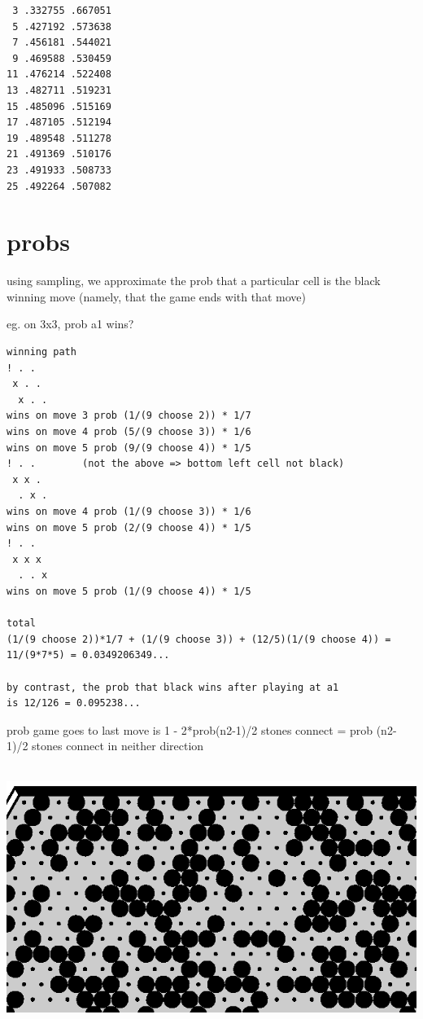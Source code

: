 \documentclass[12pt]{article}
\begin{document}

\begin{verbatim}
 3 .332755 .667051
 5 .427192 .573638
 7 .456181 .544021
 9 .469588 .530459
11 .476214 .522408
13 .482711 .519231
15 .485096 .515169
17 .487105 .512194
19 .489548 .511278
21 .491369 .510176
23 .491933 .508733
25 .492264 .507082
\end{verbatim}
\newpage
\vspace*{-3cm}

\newpage
\section{probs}
using sampling, we approximate the prob that a particular
cell is the black winning move (namely, that the game ends with that move)

eg. on 3x3, prob a1 wins?
\begin{verbatim}
winning path
! . .        
 x . .
  x . .
wins on move 3 prob (1/(9 choose 2)) * 1/7
wins on move 4 prob (5/(9 choose 3)) * 1/6
wins on move 5 prob (9/(9 choose 4)) * 1/5
! . .        (not the above => bottom left cell not black)
 x x .
  . x .
wins on move 4 prob (1/(9 choose 3)) * 1/6
wins on move 5 prob (2/(9 choose 4)) * 1/5
! . .        
 x x x
  . . x
wins on move 5 prob (1/(9 choose 4)) * 1/5

total
(1/(9 choose 2))*1/7 + (1/(9 choose 3)) + (12/5)(1/(9 choose 4)) = 
11/(9*7*5) = 0.0349206349...

by contrast, the prob that black wins after playing at a1
is 12/126 = 0.095238...
\end{verbatim}

prob game goes to last move is 1 - 2*prob(n2-1)/2 stones connect
= prob (n2-1)/2 stones connect in neither direction

\newpage
\ \hfill \includegraphics[scale=1]{draw/bigboard.eps} \hfill \ 
\end{document}
